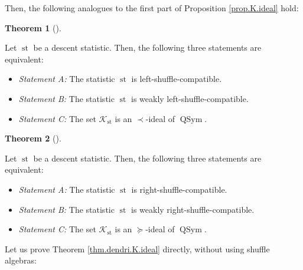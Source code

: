 \documentclass[numbers=enddot,12pt,final,onecolumn,notitlepage]{scrartcl}%
\theoremstyle{definition}
\newtheorem{theo}{Theorem}[section]
\newenvironment{theorem}[1][]
{\begin{theo}[#1]\begin{leftbar}}
{\end{leftbar}\end{theo}}
\begin{document}
Then, the following analogues to the first part of Proposition
\ref{prop.K.ideal} hold:

\begin{theorem}
\label{thm.dendri.K.ideal}Let $\operatorname*{st}$ be a descent statistic.
Then, the following three statements are equivalent:

\begin{itemize}
\item \textit{Statement A:} The statistic $\operatorname*{st}$ is left-shuffle-compatible.

\item \textit{Statement B:} The statistic $\operatorname*{st}$ is weakly left-shuffle-compatible.

\item \textit{Statement C:} The set $\mathcal{K}_{\operatorname*{st}}$ is an
$\left.  \prec\right.  $-ideal of $\operatorname*{QSym}$.
\end{itemize}
\end{theorem}

\begin{theorem}
\label{thm.dendri.K.ideal-R}Let $\operatorname*{st}$ be a descent statistic.
Then, the following three statements are equivalent:

\begin{itemize}
\item \textit{Statement A:} The statistic $\operatorname*{st}$ is right-shuffle-compatible.

\item \textit{Statement B:} The statistic $\operatorname*{st}$ is weakly right-shuffle-compatible.

\item \textit{Statement C:} The set $\mathcal{K}_{\operatorname*{st}}$ is an
$\left.  \succeq\right.  $-ideal of $\operatorname*{QSym}$.
\end{itemize}
\end{theorem}

Let us prove Theorem \ref{thm.dendri.K.ideal} directly, without using shuffle algebras:
\end{document}
